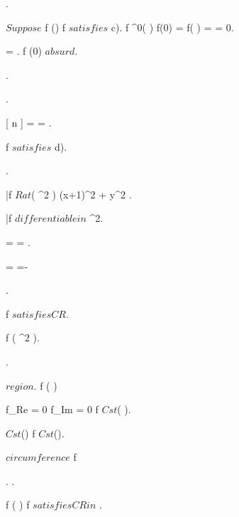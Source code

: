\documentclass[../Main/main]{subfiles}
\begin{document}
{{{{				
			}.

			{
				$ Suppose $ \exists \; f \in \Hc(\D) \suchthat f $ satisfies $ c).
				f \in \Cc^0( \D ) \imp f(0) = f(  ) =  = 0.

				 =  \nin \C.
				f \nin \Hc(0) $ absurd $.
			}.

			{
				.

				{
					 =  = 
				}.

				f $ satisfies $ d).


				.

				\bar{f} \in $ Rat$( \R^2 ) \logicAnd {}
				{
					(x+1)^2 + y^2 
				}.

				\bar{f} $ differentiable in $ \R^2.

				{
					 =  = .

					 = =-
				}.				

				f $ satisfies CR $.

				\conclude f \in \Hc( \R^2 ).

			}.
		}
	}


	{
		{
			\Omega \subset \C $ region $.
			f \in \Hc( \Omega )
		}
		\holds
		{
			f_{Re} = 0 \logicOr f_{Im} = 0 \imp f \in $ Cst$( \Omega ).

			 \in $ Cst$(\Omega) \imp f \in $ Cst$(\Omega).

			 $ circumference $ \imp f \in \constant{ \Omega }

		}
		\demonstration
		{
			{
				.
				.

				f \in \Hc( \Omega ) \imp f $ satisfies CR in $ \Omega.

}}}}
\end{document}
